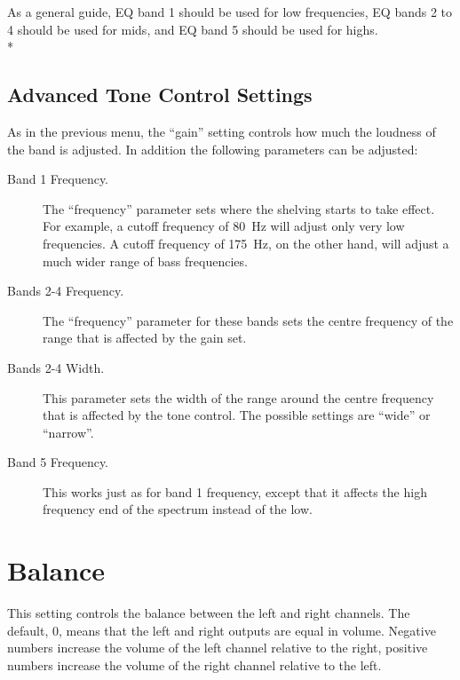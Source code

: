 {  As a general guide, EQ band 1 should be used for low frequencies, EQ bands 2
  to 4 should be used for mids, and EQ band 5 should be used for highs.\\*

  \subsection{Advanced Tone Control Settings}
    As in the previous menu, the ``gain'' setting controls how much the
    loudness of the band is adjusted.  In addition the following parameters
    can be adjusted:

  \begin{description}
    \item[Band 1 Frequency.]
        The ``frequency'' parameter sets where the shelving starts to take
        effect. For example, a cutoff frequency of 80~Hz will adjust only very
        low frequencies. A cutoff frequency of 175~Hz, on the other hand, will
        adjust a much wider range of bass frequencies.
  \item[Bands 2-4 Frequency.]
        The ``frequency'' parameter for these bands sets the centre frequency of
        the range that is affected by the gain set.
  \item[Bands 2-4 Width.]
        This parameter sets the width of the range around the centre frequency
        that is affected by the tone control. The possible settings are
        ``wide'' or ``narrow''.
  \item[Band 5 Frequency.]
        This works just as for band 1 frequency, except that it affects the
        high frequency end of the spectrum instead of the low.
  \end{description}

}

\section{Balance}
  This setting controls the balance between the left and right channels. The
  default, 0, means that the left and right outputs are equal in volume.
  Negative numbers increase the volume of the left channel relative to the
  right, positive numbers increase the volume of the right channel relative
  to the left.

